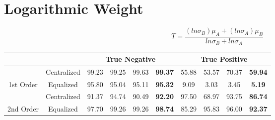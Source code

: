\documentclass[10pt,a4paper]{article}
\begin{document}
	\section{Logarithmic Weight}
		$$T = \frac{(ln\sigma_B)\mu_A + (ln\sigma_A)\mu_B}{ln\sigma_B + ln\sigma_A}$$
		\begin{table}[!h]
			\centering
			\begin{tabular}{|c|c|c|c|c|c|c|c|c|c|}
				\hline
				&             & \multicolumn{4}{c|}{True Negative}                            & \multicolumn{4}{c|}{True Positive}                            \\ \hline
				& Centralized & 99.23 & 99.25 & 99.63 & {\color[HTML]{FE0000} \textbf{99.37}} & 55.88 & 53.57 & 70.37 & {\color[HTML]{FE0000} \textbf{59.94}} \\ \cline{2-10} 
				\multirow{-2}{*}{1st Order} & Equalized   & 95.80 & 95.04 & 95.11 & {\color[HTML]{FE0000} \textbf{95.32}} & 9.09  & 3.03  & 3.45  & {\color[HTML]{FE0000} \textbf{5.19}}  \\ \hline
				& Centralized & 91.37 & 94.74 & 90.49 & {\color[HTML]{FE0000} \textbf{92.20}} & 97.50 & 68.97 & 93.75 & {\color[HTML]{FE0000} \textbf{86.74}} \\ \cline{2-10} 
				\multirow{-2}{*}{2nd Order} & Equalized   & 97.70 & 99.26 & 99.26 & {\color[HTML]{FE0000} \textbf{98.74}} & 85.29 & 95.83 & 96.00 & {\color[HTML]{FE0000} \textbf{92.37}} \\ \hline
			\end{tabular}
		\end{table}
	
\end{document}
